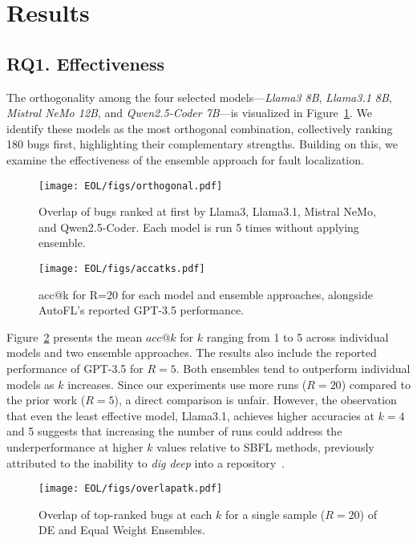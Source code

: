 
\section{Results}
\label{sec:results}

\subsection{RQ1. Effectiveness}

The orthogonality among the four selected models—\textit{Llama3 8B}, \textit{Llama3.1 8B}, \textit{Mistral NeMo 12B}, and \textit{Qwen2.5-Coder 7B}—is visualized in Figure~\ref{fig:overlap_of_models}. We identify these models as the most orthogonal combination, collectively ranking 180 bugs first, highlighting their complementary strengths. Building on this, we examine the effectiveness of the ensemble approach for fault localization.

\begin{figure}[htbp]
\centerline{\texttt{[image: EOL/figs/orthogonal.pdf]}}
\caption{Overlap of bugs ranked at first by Llama3, Llama3.1, Mistral NeMo, and Qwen2.5-Coder. Each model is run 5 times without applying ensemble.}
\label{fig:overlap_of_models}
\end{figure}

\begin{figure}[htbp]
\centerline{\texttt{[image: EOL/figs/accatks.pdf]}}
\caption{acc@k for R=20 for each model and ensemble approaches, alongside AutoFL’s reported GPT-3.5 performance.}
\label{fig:acc_at_k}
\end{figure}

Figure~\ref{fig:acc_at_k} presents the mean $acc@k$ for $k$ ranging from 1 to 5 across individual models and two ensemble approaches. The results also include the reported performance of GPT-3.5 for $R=5$. Both ensembles tend to outperform individual models as $k$ increases. Since our experiments use more runs ($R=20$) compared to the prior work ($R=5$), a direct comparison is unfair. However, the observation that even the least effective model, Llama3.1, achieves higher accuracies at $k=4$ and 5 suggests that increasing the number of runs could address the underperformance at higher $k$ values relative to SBFL methods, previously attributed to the inability to \textit{dig deep} into a repository~\cite{kangQuantitativeQualitativeEvaluation2024a}.

\begin{figure}[htbp]
\centerline{\texttt{[image: EOL/figs/overlapatk.pdf]}}
\caption{Overlap of top-ranked bugs at each $k$ for a single sample ($R=20$) of DE and Equal Weight Ensembles.}
\label{fig:overlap_at_k}
\end{figure}


